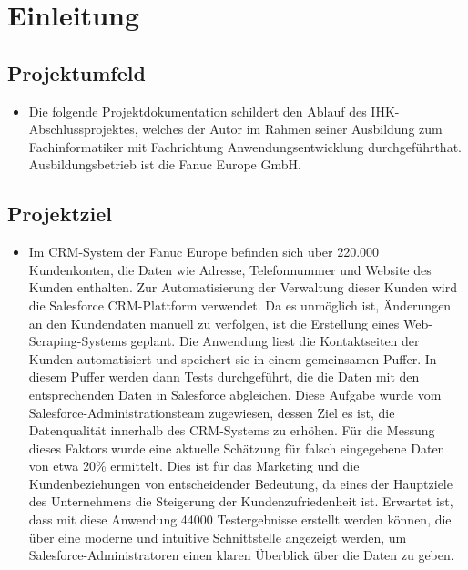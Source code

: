 \section{Einleitung}
\label{sec:Einleitung}


\subsection{Projektumfeld} 
\label{sec:Projektumfeld}
\begin{itemize}
	\item Die folgende Projektdokumentation schildert den Ablauf des IHK-Abschlussprojektes, welches der Autor im Rahmen seiner Ausbildung zum Fachinformatiker mit Fachrichtung Anwendungsentwicklung durchgef\"uhrthat. Ausbildungsbetrieb ist die Fanuc Europe GmbH.
\end{itemize}

\subsection{Projektziel} 
\label{sec:Projektziel}
\begin{itemize}
  \item Im CRM-System der Fanuc Europe befinden sich \"uber 220.000 Kundenkonten, die Daten wie
	Adresse, Telefonnummer und Website des Kunden enthalten. Zur Automatisierung der
	Verwaltung dieser Kunden wird die Salesforce CRM-Plattform verwendet.
	Da es unm\"oglich ist, \"Anderungen an den Kundendaten manuell zu verfolgen, ist die Erstellung
	eines Web-Scraping-Systems geplant. Die Anwendung liest die Kontaktseiten der Kunden automatisiert und speichert sie in einem gemeinsamen Puffer.
	In diesem Puffer werden dann Tests durchgef\"uhrt, die die Daten mit den entsprechenden Daten in Salesforce abgleichen.
	Diese Aufgabe wurde vom Salesforce-Administrationsteam zugewiesen, dessen Ziel es ist, die Datenqualit\"at innerhalb des CRM-Systems zu erh\"ohen. F\"ur die Messung dieses Faktors wurde eine aktuelle Sch\"atzung f\"ur falsch eingegebene Daten von etwa 20\% ermittelt. Dies ist f\"ur das Marketing und die Kundenbeziehungen von entscheidender Bedeutung, da eines der Hauptziele des Unternehmens die Steigerung der Kundenzufriedenheit ist. Erwartet ist, dass mit diese Anwendung 44000 Testergebnisse erstellt werden k\"onnen, die \"uber eine moderne und intuitive Schnittstelle angezeigt werden, um Salesforce-Administratoren einen klaren \"Uberblick \"uber die Daten zu geben.

\end{itemize}


